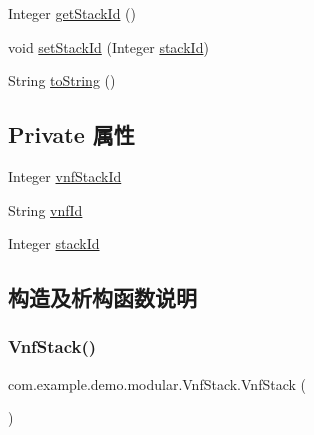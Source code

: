 \begin{DoxyCompactItemize}
\item 
Integer \mbox{\hyperlink{classcom_1_1example_1_1demo_1_1modular_1_1_vnf_stack_aab31dcea6ab668b2a4b4b44ffcdf0730}{get\+Stack\+Id}} ()
\item 
void \mbox{\hyperlink{classcom_1_1example_1_1demo_1_1modular_1_1_vnf_stack_a8ad55db94be344f77112011ce1efb9a5}{set\+Stack\+Id}} (Integer \mbox{\hyperlink{classcom_1_1example_1_1demo_1_1modular_1_1_vnf_stack_af4df7dc111639b96b4cba90bc63b3b01}{stack\+Id}})
\item 
String \mbox{\hyperlink{classcom_1_1example_1_1demo_1_1modular_1_1_vnf_stack_a9eaa3e7b2ba7b5cdb083451ff9e095fe}{to\+String}} ()
\end{DoxyCompactItemize}
\subsection*{Private 属性}
\begin{DoxyCompactItemize}
\item 
Integer \mbox{\hyperlink{classcom_1_1example_1_1demo_1_1modular_1_1_vnf_stack_a0ed3f4362c541c67238c094a9c6f85a0}{vnf\+Stack\+Id}}
\item 
String \mbox{\hyperlink{classcom_1_1example_1_1demo_1_1modular_1_1_vnf_stack_abcbee47f229981b7533062f6daea4f4e}{vnf\+Id}}
\item 
Integer \mbox{\hyperlink{classcom_1_1example_1_1demo_1_1modular_1_1_vnf_stack_af4df7dc111639b96b4cba90bc63b3b01}{stack\+Id}}
\end{DoxyCompactItemize}


\subsection{构造及析构函数说明}
\mbox{\label{classcom_1_1example_1_1demo_1_1modular_1_1_vnf_stack_aaeae30e8f704dc68996106473def996c}} 
\subsubsection{\texorpdfstring{Vnf\+Stack()}{VnfStack()}\hspace{0.1cm}{\footnotesize\ttfamily [1/3]}}
{\footnotesize\ttfamily com.\+example.\+demo.\+modular.\+Vnf\+Stack.\+Vnf\+Stack (\begin{DoxyParamCaption}{ }\end{DoxyParamCaption})}

